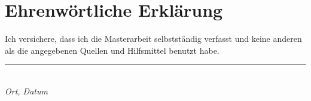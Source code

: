 \section*{Ehrenwörtliche Erklärung}
Ich versichere, dass ich die Masterarbeit selbstständig verfasst und keine anderen als die angegebenen Quellen und Hilfsmittel benutzt habe. 

\vspace{20pt}
\rule{150pt}{1pt} \\
\textit{Ort, Datum}